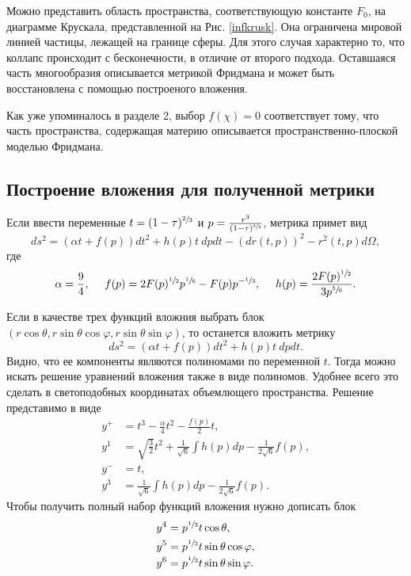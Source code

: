 \documentclass[12pt]{article}
\newcommand{\bq}{\begin{equation}}
\newcommand{\eq}{\end{equation}}
\begin{document}
Можно представить область пространства, соответствующую константе $F_0$, на диаграмме Крускала, представленной на Рис. \ref{infkrusk}. Она ограничена мировой линией частицы, лежащей на границе сферы. Для этого случая характерно то, что коллапс происходит с бесконечности, в отличие от второго подхода. Оставшаяся часть многообразия описывается метрикой Фридмана и может быть восстановлена с помощью построеного вложения.

Как уже упоминалось в разделе 2, выбор $f(\chi)=0$ соответствует тому, что часть пространства, содержащая материю описывается пространственно-плоской моделью Фридмана.

\subsection{Построение вложения для полученной метрики}

Если ввести переменные $t = (1-\tau)^{\sfrac{2}{3}}$ и $p = \frac{r^3}{(1-\tau)^{\sfrac{4}{3}}}$, метрика примет вид
\bq
	d s^2 = \left(\alpha t +f(p) \right) dt^2 + h(p) t \ dp dt - \left(dr(t,p)\right)^2 - r^2(t,p) d \Omega,
\eq
где 
\[
\alpha = \frac{9}{4},\ \ \ \  f(p) = 2 F(p)^{\sfrac{1}{2}} p^{\sfrac{1}{6}} - F(p) p^{-\sfrac{1}{3}}, \ \ \ \  h(p) = \frac{2F(p)^{\sfrac{1}{2}}}{3p^{\sfrac{5}{6}}}.
\]

Если в качестве трех функций вложния выбрать блок $(r \cos{\theta},r \sin{\theta}\cos{\varphi},r \sin{\theta}\sin{\varphi})$, то останется вложить метрику
\bq
	d s^2 = \left(\alpha t +f(p) \right) dt^2 + h(p) t \ dp dt.
\eq
Видно, что ее компоненты являются полиномами по переменной $t$. Тогда можно искать решение уравнений вложения также в виде полиномов. Удобнее всего это сделать в светоподобных координатах объемлющего пространства. Решение представимо в виде
\begin{align}
	y^{+} &= t^3 - \frac{\alpha}{4}t^2-\frac{f(p)}{2}t, \\
	y^1 &= \sqrt{\frac{3}{2}}t^2 + \frac{1}{\sqrt{6}}\int h(p)dp - \frac{1}{2\sqrt{6}}f(p), \\
	y^{-} &= t, \\
	y^{3} &= \frac{1}{\sqrt{6}}\int h(p)dp - \frac{1}{2\sqrt{6}}f(p).
\end{align}
Чтобы получить полный набор функций вложения нужно дописать блок
\begin{align}
	y^4 &= p^{\sfrac{1}{3}}t \cos{\theta}, \\
	y^5 &= p^{\sfrac{1}{3}}t \sin{\theta} \cos{\varphi}, \\
	y^6 &= p^{\sfrac{1}{3}}t\sin{\theta} \sin{\varphi}.
\end{align}
\end{document}
